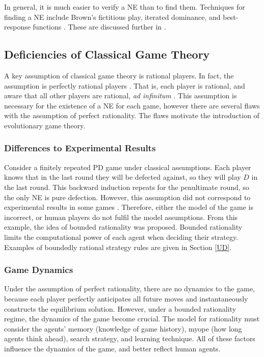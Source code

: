 In general, it is much easier to verify a NE than to find them. Techniques for finding a NE include Brown's fictitious play, iterated dominance, and best-response functions \cite{RN99}. These are discussed further in \cite{RN99}. 
\subsection{Deficiencies of Classical Game Theory} \label{Differences}
A key assumption of classical game theory is rational players. In fact, the assumption is perfectly rational players \cite{RN99}. That is, each player is rational, and aware that all other players are rational, \emph{ad infinitum} \cite{RN78}. This assumption is necessary for the existence of a NE for each game, however there are several flaws with the assumption of perfect rationality. The flaws motivate the introduction of evolutionary game theory.

\subsubsection{Differences to Experimental Results}
 Consider a finitely repeated PD game under classical assumptions. Each player knows that in the last round they will be defected against, so they will play $D$ in the last round. This backward induction repeats for the penultimate round, so the only NE is pure defection. However, this assumption did not correspond to experimental results in some games \cite{RN99, RN50}. Therefore, either the model of the game is incorrect, or human players do not fulfil the model assumptions. From this example, the idea of bounded rationality was proposed. Bounded rationality limits the computational power of each agent when deciding their strategy. Examples of boundedly rational strategy rules are given in Section \ref{UD}. 

\subsubsection{Game Dynamics}
Under the assumption of perfect rationality, there are no dynamics to the game, because each player perfectly anticipates all future moves and instantaneously constructs the equilibrium solution. However, under a bounded rationality regime, the dynamics of the game become crucial. The model for rationality must consider the agents' memory (knowledge of game history), myope (how long agents think ahead), search strategy, and learning technique. All of these factors influence the dynamics of the game, and better reflect human agents.

